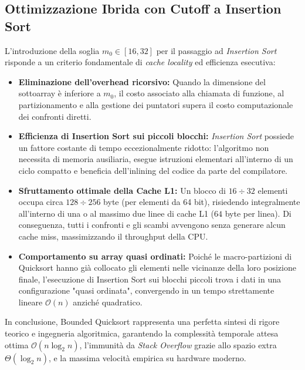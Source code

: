 \subsection{Ottimizzazione Ibrida con Cutoff a Insertion Sort}
\label{subsec:bqs-cutoff-insertion-sort}

L'introduzione della soglia $m_0 \in [16, 32]$ per il passaggio ad \textit{Insertion Sort} risponde a un criterio fondamentale di \textit{cache locality} ed efficienza esecutiva:

\begin{itemize}
  \item \textbf{Eliminazione dell'overhead ricorsivo:} Quando la dimensione del sottoarray è inferiore a $m_0$, il costo associato alla chiamata di funzione, al partizionamento e alla gestione dei puntatori supera il costo computazionale dei confronti diretti.
  \item \textbf{Efficienza di Insertion Sort sui piccoli blocchi:} \textit{Insertion Sort} possiede un fattore costante di tempo eccezionalmente ridotto: l'algoritmo non necessita di memoria ausiliaria, esegue istruzioni elementari all'interno di un ciclo compatto e beneficia dell'inlining del codice da parte del compilatore.
  \item \textbf{Sfruttamento ottimale della Cache L1:} Un blocco di $16 \div 32$ elementi occupa circa $128 \div 256$ byte (per elementi da 64 bit), risiedendo integralmente all'interno di una o al massimo due linee di cache L1 ($64$ byte per linea). Di conseguenza, tutti i confronti e gli scambi avvengono senza generare alcun cache miss, massimizzando il throughput della CPU.
  \item \textbf{Comportamento su array quasi ordinati:} Poiché le macro-partizioni di Quicksort hanno già collocato gli elementi nelle vicinanze della loro posizione finale, l'esecuzione di Insertion Sort sui blocchi piccoli trova i dati in una configurazione "quasi ordinata", convergendo in un tempo strettamente lineare $\mathcal{O}(n)$ anziché quadratico.
\end{itemize}

In conclusione, Bounded Quicksort rappresenta una perfetta sintesi di rigore teorico e ingegneria algoritmica, garantendo la complessità temporale attesa ottima $\mathcal{O}(n \log_2 n)$, l'immunità da \textit{Stack Overflow} grazie allo spazio extra $\Theta(\log_2 n)$, e la massima velocità empirica su hardware moderno.
